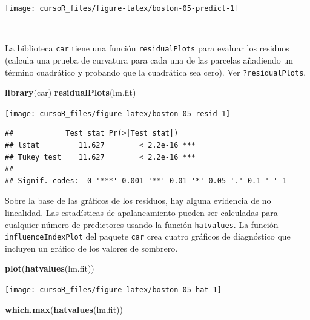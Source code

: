 \documentclass[]{book}
\newenvironment{Shaded}{\begin{snugshade}}{\end{snugshade}}
\newcommand{\KeywordTok}[1]{\textcolor[rgb]{0.13,0.29,0.53}{\textbf{#1}}}
\newcommand{\NormalTok}[1]{#1}
\begin{document}
\begin{center}\texttt{[image: cursoR\_files/figure-latex/boston-05-predict-1]} \end{center}

~

La biblioteca \texttt{car} tiene una función \texttt{residualPlots} para
evaluar los residuos (calcula una prueba de curvatura para cada una de
las parcelas añadiendo un término cuadrático y probando que la
cuadrática sea cero). Ver \texttt{?residualPlots}.

\begin{Shaded}
\begin{Highlighting}[]
\KeywordTok{library}\NormalTok{(car)}
\KeywordTok{residualPlots}\NormalTok{(lm.fit)}
\end{Highlighting}
\end{Shaded}

\begin{center}\texttt{[image: cursoR\_files/figure-latex/boston-05-resid-1]} \end{center}

\begin{verbatim}
##            Test stat Pr(>|Test stat|)    
## lstat         11.627        < 2.2e-16 ***
## Tukey test    11.627        < 2.2e-16 ***
## ---
## Signif. codes:  0 '***' 0.001 '**' 0.01 '*' 0.05 '.' 0.1 ' ' 1
\end{verbatim}

Sobre la base de las gráficos de los residuos, hay alguna evidencia de
no linealidad. Las estadísticas de apalancamiento pueden ser calculadas
para cualquier número de predictores usando la función
\texttt{hatvalues}. La función \texttt{influenceIndexPlot} del paquete
\texttt{car} crea cuatro gráficos de diagnóstico que incluyen un gráfico
de los valores de sombrero.

\begin{Shaded}
\begin{Highlighting}[]
\KeywordTok{plot}\NormalTok{(}\KeywordTok{hatvalues}\NormalTok{(lm.fit))}
\end{Highlighting}
\end{Shaded}

\begin{center}\texttt{[image: cursoR\_files/figure-latex/boston-05-hat-1]} \end{center}

\begin{Shaded}
\begin{Highlighting}[]
\KeywordTok{which.max}\NormalTok{(}\KeywordTok{hatvalues}\NormalTok{(lm.fit))}
\end{Highlighting}
\end{Shaded}
\end{document}
